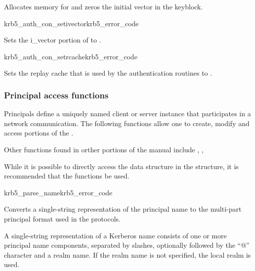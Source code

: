 Allocates memory for and zeros the initial vector in the
 keyblock.

\begin{funcdecl}{krb5_auth_con_setivector}{krb5_error_code}{\funcinout}
\funcin
{}
\end{funcdecl}

Sets the i_vector portion of  to
. 

\begin{funcdecl}{krb5_auth_con_setrcache}{krb5_error_code}{\funcinout}
\funcin
{}
\end{funcdecl}

Sets the replay cache that is used by the authentication routines to .


\subsubsection{Principal access functions}

Principals define a uniquely named client or server instance that
participates in a network communication. The following functions allow
one to create, modify and access portions of the
. 

Other functions found in orther portions of the manual include
, , 

While it is possible to directly access the data structure in the
structure, it is recommended that the functions be used. 

\begin{funcdecl}{krb5_parse_name}{krb5_error_code}{\funcinout}
\funcin
{}
\funcout
{}
\end{funcdecl}

Converts a single-string representation  of the
principal name to the multi-part principal format used in the protocols.

A single-string representation of a Kerberos name consists of one or
more principal name components, separated by slashes, optionally
followed by the ``@'' character and a realm name.  If the realm name
is not specified, the local realm is used.


